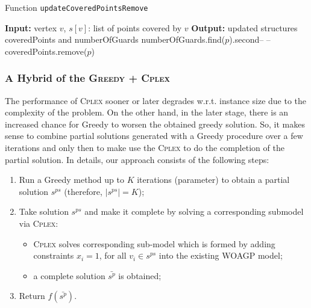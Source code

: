 \documentclass[runningheads,a4paper]{elsarticle}
\begin{document}

            \begin{algorithm}[!t]
          	\caption{Function \texttt{updateCoveredPointsRemove}}\label{alg:updateCoveredPointsRemove}
          	\begin{algorithmic}[1]
          		\State \textbf{Input:} vertex $v$, $s[v]$:  list of points covered by $v$
          		\State \textbf{Output:} updated structures coveredPoints and numberOfGuards
          		\State numberOfGuards.find($p$).second-- --
                    \State coveredPoints.remove($p$)
                    \EndIf
          		\EndFor
          	\end{algorithmic}
          \end{algorithm}
\subsubsection{A Hybrid of the \textsc{Greedy + \textsc{Cplex}}}
	The performance of \textsc{Cplex}  sooner or later degrades w.r.t. instance size due to the complexity of the problem. On the other hand, in the later stage, there is an increased chance for Greedy to worsen the obtained greedy solution. So, it makes sense to combine  partial solutions generated with a Greedy procedure over a few iterations  and only then to make use the \textsc{Cplex} to do the completion of the partial solution. In details, our approach consists of the following steps:
	\begin{enumerate}
		\item Run a Greedy method up to $K$ iterations (parameter) to obtain a partial solution $s^{ps}$ (therefore, $|s^{ps}| = K$);
		\item Take solution $s^{ps}$ and make it complete by solving a corresponding submodel via \textsc{Cplex}:
		\begin{itemize}
			\item \textsc{Cplex} solves corresponding sub-model which is formed by adding constraints $x_{i} = 1$, for all $v_i \in s^{ps}$ into the existing WOAGP model;
			\item a complete solution $\bar {s^p}$ is obtained;
		\end{itemize}
		\item Return $f(\bar {s^p})$.
	\end{enumerate}
\end{document}
